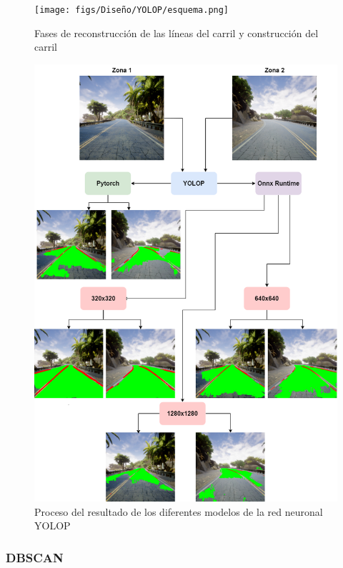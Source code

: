 \begin{figure} [H]
  \begin{center}
    \texttt{[image: figs/Diseño/YOLOP/esquema.png]}
  \end{center}
  \caption{Fases de reconstrucción de las líneas del carril y construcción del carril}
  \label{Proceso}
\end{figure}

\begin{figure} [H]
  \begin{center}
    \includegraphics[width=1.0\textwidth]{figs/Diseño/YOLOP/Diagrama sin título.drawio.png}
  \end{center}
  \caption{Proceso del resultado de los diferentes modelos de la red neuronal YOLOP}
  \label{Proceso-YOLOP}
\end{figure}
\newpage
\subsubsection{DBSCAN}
\label{sec:DBSCAN}

